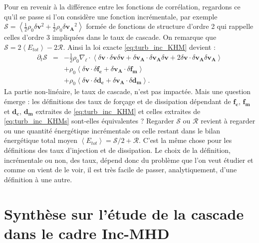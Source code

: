 Pour en revenir à la différence entre les fonctions de corrélation, regardons ce qu'il se passe si l'on considère une fonction incrémentale, par exemple $\mathcal{S} =  \left<\frac{1}{2} \rho_0 \delta \boldsymbol{v}^2 + \frac{1}{2} \rho_0 \delta \boldsymbol{v_A}^2\right>$ formée de fonctions de structure d'ordre 2 qui rappelle celles d'ordre 3 impliquées dans le taux de cascade. On remarque que $\mathcal{S} = 2\left<E_{tot}\right> - 2\mathcal{R}$. Ainsi la loi exacte  \eqref{eq:turb_inc_KHM} devient : 
\begin{eqnarray}
\label{eq:turb_inc_KHMs}    \partial_t \mathcal{S} &=& -\frac{1}{2} \rho_0 \nabla_{\boldsymbol{\ell}} \cdot \left< \delta \boldsymbol{v} \cdot \delta \boldsymbol{v} \delta \boldsymbol{v} + \delta \boldsymbol{v_A} \cdot \delta \boldsymbol{v_A} \delta \boldsymbol{v} + 2 \delta \boldsymbol{v} \cdot \delta \boldsymbol{v_A} \delta \boldsymbol{v_A}\right> \\
    &&+ \rho_0 \left<\delta \boldsymbol{v} \cdot \delta \boldsymbol{f_c} + \delta \boldsymbol{v_A} \cdot \delta \boldsymbol{f_m} \right> \\
    &&+ \rho_0 \left<\delta \boldsymbol{v} \cdot \delta \boldsymbol{d_c} + \delta \boldsymbol{v_A} \cdot \delta \boldsymbol{d_m}\right>.
\end{eqnarray}
La partie non-linéaire, le taux de cascade, n'est pas impactée. Mais une question émerge : les définitions des taux de forçage et de dissipation dépendant de $\boldsymbol{f_c}$, $\boldsymbol{f_m}$ et $\boldsymbol{d_c}$, $\boldsymbol{d_m}$ extraites de \eqref{eq:turb_inc_KHM} et celles extraites de \eqref{eq:turb_inc_KHMs} sont-elles équivalentes ? Regarder $\mathcal{S}$ ou $\mathcal{R}$ revient à regarder ou une quantité énergétique incrémentale ou celle restant dans le bilan énergétique total moyen $\left<E_{tot}\right> = \mathcal{S}/2 + \mathcal{R}$. C'est la même chose pour les définitions des taux d'injection et de dissipation. Le choix de la définition, incrémentale ou non, des taux, dépend donc du problème que l'on veut étudier et comme on vient de le voir, il est très facile de passer, analytiquement, d'une définition à une autre.  

\newpage
\section{Synthèse sur l'étude de la cascade dans le cadre Inc-MHD}\label{synt-11}

